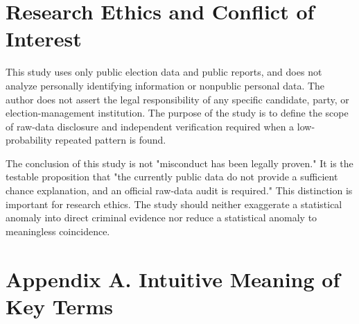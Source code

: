 \documentclass[preprint]{IEIE}
\begin{document}
\section{Research Ethics and Conflict of Interest}

This study uses only public election data and public reports, and does not analyze personally identifying information or nonpublic personal data. The author does not assert the legal responsibility of any specific candidate, party, or election-management institution. The purpose of the study is to define the scope of raw-data disclosure and independent verification required when a low-probability repeated pattern is found.

The conclusion of this study is not "misconduct has been legally proven." It is the testable proposition that "the currently public data do not provide a sufficient chance explanation, and an official raw-data audit is required." This distinction is important for research ethics. The study should neither exaggerate a statistical anomaly into direct criminal evidence nor reduce a statistical anomaly to meaningless coincidence.

\clearpage
\onecolumn
\section*{Appendix A. Intuitive Meaning of Key Terms}
\end{document}
